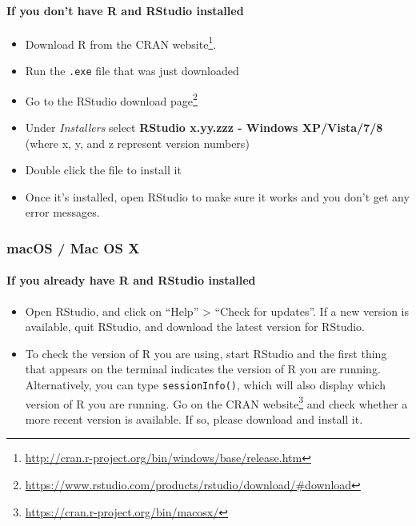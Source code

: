 \documentclass[
  12pt,
]{book}
\newcommand{\passthrough}[1]{#1}
\providecommand{\tightlist}{%
  \setlength{\itemsep}{0pt}\setlength{\parskip}{0pt}}
\renewcommand{\href}[2]{#2\footnote{\url{#1}}}
\theoremstyle{definition}
\theoremstyle{definition}
\theoremstyle{definition}
\newcommand{\1}{\mathbbm{1}}
\begin{document}
\hypertarget{if-you-dont-have-r-and-rstudio-installed}{%
\paragraph{If you don't have R and RStudio installed}\label{if-you-dont-have-r-and-rstudio-installed}}

\begin{itemize}
\tightlist
\item
  Download R from
  the \href{http://cran.r-project.org/bin/windows/base/release.htm}{CRAN website}.
\item
  Run the \passthrough{\lstinline!.exe!} file that was just downloaded
\item
  Go to the \href{https://www.rstudio.com/products/rstudio/download/\#download}{RStudio download
  page}
\item
  Under \emph{Installers} select \textbf{RStudio x.yy.zzz - Windows
  XP/Vista/7/8} (where x, y, and z represent version numbers)
\item
  Double click the file to install it
\item
  Once it's installed, open RStudio to make sure it works and you don't get any
  error messages.
\end{itemize}

\hypertarget{macos-mac-os-x}{%
\subsubsection{macOS / Mac OS X}\label{macos-mac-os-x}}

\hypertarget{if-you-already-have-r-and-rstudio-installed-1}{%
\paragraph{If you already have R and RStudio installed}\label{if-you-already-have-r-and-rstudio-installed-1}}

\begin{itemize}
\tightlist
\item
  Open RStudio, and click on ``Help'' \textgreater{} ``Check for updates''. If a new version is
  available, quit RStudio, and download the latest version for RStudio.
\item
  To check the version of R you are using, start RStudio and the first thing
  that appears on the terminal indicates the version of R you are running.
  Alternatively, you can type \passthrough{\lstinline!sessionInfo()!}, which will also display which
  version of R you are running. Go on the \href{https://cran.r-project.org/bin/macosx/}{CRAN
  website} and check whether a more
  recent version is available. If so, please download and install it.
\end{itemize}
\end{document}
